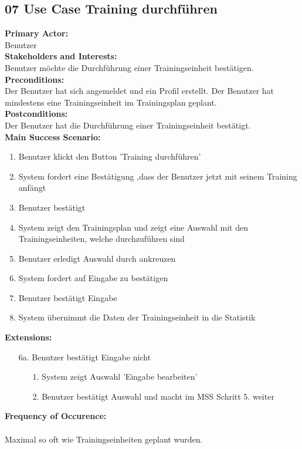 \documentclass[12pt,a4paper,onecolumn]{article}
\begin{document}
\subsection{07 Use Case Training durchführen}
\textbf{Primary Actor:}\\ Benutzer\\
\textbf{Stakeholders and Interests:}\\
Benutzer möchte die Durchführung einer \gls{Trainingseinheit} bestätigen.\\
\textbf{Preconditions:} \\  Der Benutzer hat sich angemeldet und ein Profil erstellt. Der Benutzer hat mindestens eine \gls{Trainingseinheit} im \gls{Trainingsplan} geplant. \\
\textbf{Postconditions:}\\Der Benutzer hat die Durchführung einer \gls{Trainingseinheit} bestätigt.\\
\textbf{Main Success Scenario:}
\begin{enumerate}
    \item Benutzer klickt den Button 'Training durchführen'
    \item System fordert eine Bestätigung ,dass der Benutzer jetzt mit seinem Training anfängt
    \item Benutzer bestätigt
    \item System zeigt den \gls{Trainingsplan} und zeigt eine Auswahl mit den \gls{Trainingseinheit}en, welche durchzuführen sind
    \item Benutzer erledigt Auswahl durch ankreuzen
    \item System fordert auf Eingabe zu bestätigen
    \item Benutzer bestätigt Eingabe
    \item System übernimmt die Daten der \gls{Trainingseinheit} in die Statistik
\end{enumerate}
\textbf{Extensions:}
\begin{enumerate}
    \item [6a.]  Benutzer bestätigt Eingabe nicht
    \begin{enumerate}
        \item[1.]System zeigt Auswahl 'Eingabe bearbeiten'
        \item[2.]Benutzer bestätigt Auswahl und macht im MSS Schritt 5. weiter
    \end{enumerate}
\end{enumerate}
\textbf{Frequency of Occurence:}\\ \\
Maximal so oft wie \gls{Trainingseinheit}en geplant wurden. 
\end{document}

